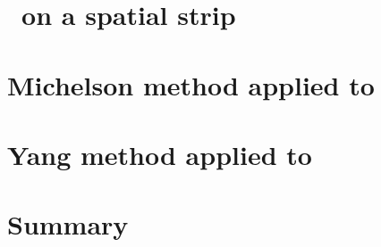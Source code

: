 \section{\KS\ on a spatial strip}
\label{ACsect:KStimeInt}
    

\section{Michelson method applied to \KSe}
\label{chap:KSmichelson}
    

\section{Yang method applied to \KSe}
\label{chap:KSyang}
    

\section{Summary}
\label{sect:summary}
    

\renewcommand{\cl}[1]{{\ensuremath{|#1|}}}  %

\printbibliography[heading=subbibintoc,title={References}]
